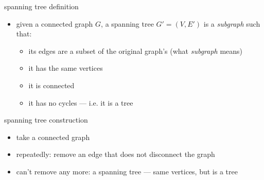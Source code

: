 \begin{frame}{spanning tree definition}
\begin{itemize}
\item given a connected graph $G$, a spanning tree $G'=(V,E')$ is a \textit{subgraph} such that:
\begin{itemize}
\item its edges are a subset of the original graph's (what \textit{subgraph} means)
\item it has the same vertices
\item it is connected
\item it has no cycles --- i.e. it is a tree
\end{itemize}
\end{itemize}
\end{frame}

\begin{frame}{spanning tree construction}
\begin{itemize}
\item take a connected graph
\item repeatedly: remove an edge that does not disconnect the graph
\item can't remove any more: a spanning tree --- same vertices, but is a tree
\end{itemize}
\end{frame}
